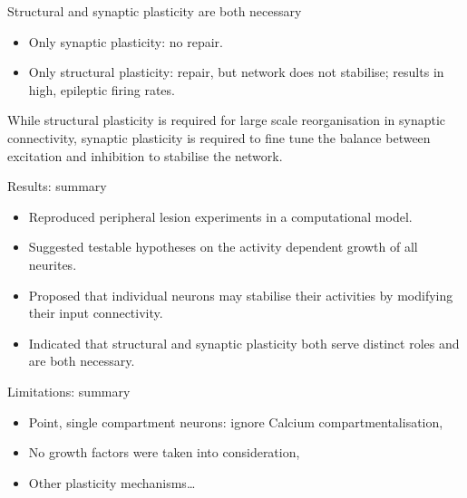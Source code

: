 \begin{frame}[c]{Structural and synaptic plasticity are both necessary}
  \begin{itemize}
    \item Only synaptic plasticity: no repair.
      \pause{}
    \item Only structural plasticity: repair, but network does not stabilise; results in high, epileptic firing rates.
      \pause{}
  \end{itemize}
  \begin{center}
  While \alert{structural plasticity} is required for \alert{large scale reorganisation} in synaptic connectivity, \alert{synaptic plasticity} is required to \alert{fine tune} the balance between excitation and inhibition to stabilise the network.
  \end{center}
\end{frame}
\begin{frame}[c]{Results: summary}
  \begin{itemize}
    \item Reproduced peripheral lesion experiments in a computational model.
    \item Suggested testable hypotheses on the activity dependent growth of all neurites.
    \item Proposed that individual neurons may stabilise their activities by modifying their input connectivity.
    \item Indicated that structural and synaptic plasticity both serve distinct roles and are both necessary.
  \end{itemize}
\end{frame}
\begin{frame}[c]{Limitations: summary}
  \begin{itemize}
    \item Point, single compartment neurons: ignore \alert{Calcium compartmentalisation},
    \item No \alert{growth factors} were taken into consideration,
    \item Other plasticity mechanisms\ldots{}
  \end{itemize}
\end{frame}
